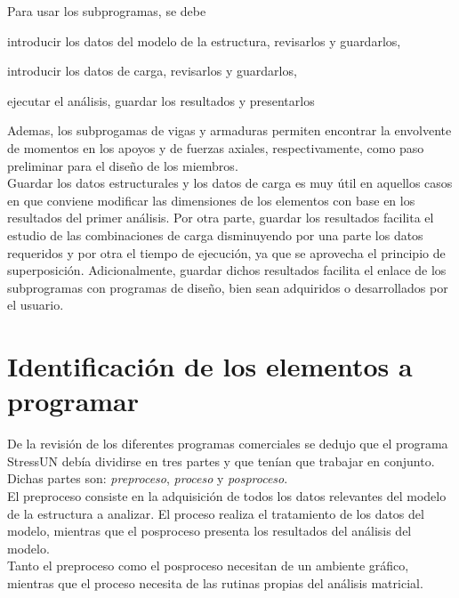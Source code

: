 Para usar los subprogramas, se debe
\begin{inparaenum}[$ (1) $]
    \item introducir los datos del modelo de la estructura, revisarlos y guardarlos, 
    \item introducir los datos de carga, revisarlos y guardarlos, 
    \item ejecutar el análisis, guardar los resultados y presentarlos
\end{inparaenum}

Ademas, los subprogamas de vigas y armaduras permiten encontrar la envolvente de momentos en los apoyos y de fuerzas axiales, respectivamente, como paso preliminar para el diseño de los miembros. \\

Guardar los datos estructurales y los datos de carga es muy útil en aquellos casos en que conviene modificar las dimensiones de los elementos con base en los resultados del primer análisis. Por otra parte, guardar los resultados facilita el estudio de las combinaciones de carga disminuyendo por una parte los datos requeridos y por otra el tiempo de ejecución, ya que se aprovecha el principio de superposición. Adicionalmente, guardar dichos resultados facilita el enlace de los subprogramas con programas de diseño, bien sean adquiridos o desarrollados por el usuario. \\

\section{Identificación de los elementos a programar}

De la revisión de los diferentes programas comerciales se dedujo que el programa StressUN debía dividirse en tres partes y que tenían que trabajar en conjunto. Dichas partes son: \textit{preproceso}, \textit{proceso} y \textit{posproceso}. \\

El preproceso consiste en la adquisición de todos los datos relevantes del modelo de la estructura a analizar. El proceso realiza el tratamiento de los datos del modelo, mientras que el posproceso presenta los resultados del análisis del modelo. \\

Tanto el preproceso como el posproceso necesitan de un ambiente gráfico, mientras que el proceso necesita de las rutinas propias del análisis matricial. \\


